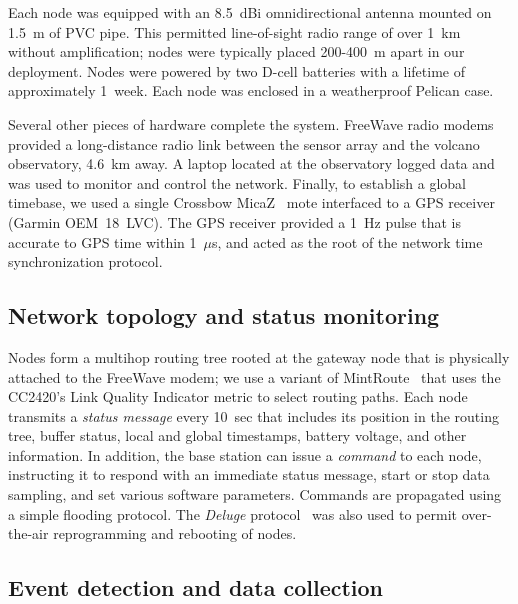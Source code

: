 Each node was equipped with an 8.5~dBi omnidirectional antenna mounted on
1.5~m of PVC pipe.  This permitted line-of-sight radio range of over 1~km
without amplification; nodes were typically placed 200-400~m apart in our
deployment. Nodes were powered by two D-cell batteries with a lifetime of
approximately 1~week.  Each node was enclosed in a weatherproof Pelican case.

Several other pieces of hardware complete the system. FreeWave radio modems
provided a long-distance radio link between the sensor array and the volcano
observatory, 4.6~km away. A laptop located at the observatory logged data and
was used to monitor and control the network.  Finally, to establish a global
timebase, we used a single Crossbow MicaZ~\cite{xbow} mote interfaced to a
GPS receiver (Garmin OEM~18~LVC).  The GPS receiver provided a 1~Hz pulse
that is accurate to GPS time within 1~$\mu$s, and acted as the root of the
network time synchronization protocol.

\subsection{Network topology and status monitoring}

Nodes form a multihop routing tree rooted at the gateway node that is
physically attached to the FreeWave modem; we use a variant of
MintRoute~\cite{awoo-multihop} that uses the CC2420's Link Quality Indicator
metric to select routing paths. Each node transmits a {\em status message}
every 10~sec that includes its position in the routing tree, buffer status,
local and global timestamps, battery voltage, and other information. 
In addition, the base station can issue a {\em command} to each node,
instructing it to respond with an immediate status message, start or stop
data sampling, and set various software parameters.  Commands are propagated
using a simple flooding protocol.  The {\em Deluge} protocol~\cite{deluge}
was also used to permit over-the-air reprogramming and rebooting of nodes.

\subsection{Event detection and data collection}

